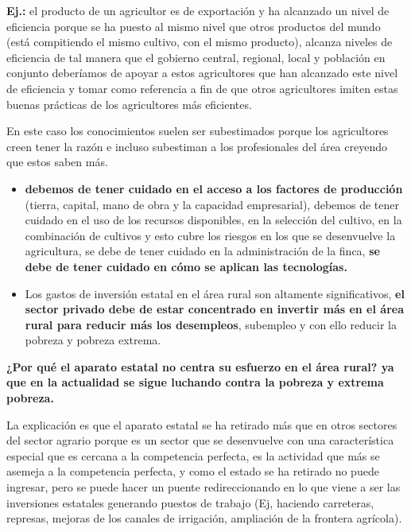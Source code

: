 \documentclass[
  a4paper,
]{article}
\begin{document}
\textbf{Ej.:} el producto de un agricultor es de exportación y ha
alcanzado un nivel de eficiencia porque se ha puesto al mismo nivel que
otros productos del mundo (está compitiendo el mismo cultivo, con el
mismo producto), alcanza niveles de eficiencia de tal manera que el
gobierno central, regional, local y población en conjunto deberíamos de
apoyar a estos agricultores que han alcanzado este nivel de eficiencia y
tomar como referencia a fin de que otros agricultores imiten estas
buenas prácticas de los agricultores más eficientes.

En este caso los conocimientos suelen ser subestimados porque los
agricultores creen tener la razón e incluso subestiman a los
profesionales del área creyendo que estos saben más.

\begin{itemize}
\item
  \textbf{debemos de tener cuidado en el acceso a los factores de
  producción} (tierra, capital, mano de obra y la capacidad
  empresarial), debemos de tener cuidado en el uso de los recursos
  disponibles, en la selección del cultivo, en la combinación de
  cultivos y esto cubre los riesgos en los que se desenvuelve la
  agricultura, se debe de tener cuidado en la administración de la
  finca, \textbf{se debe de tener cuidado en cómo se aplican las
  tecnologías.}
\item
  Los gastos de inversión estatal en el área rural son altamente
  significativos, \textbf{el sector privado debe de estar concentrado en
  invertir más en el área rural para reducir más los desempleos},
  subempleo y con ello reducir la pobreza y pobreza extrema.
\end{itemize}

\textbf{¿Por qué el aparato estatal no centra su esfuerzo en el área
rural? ya que en la actualidad se sigue luchando contra la pobreza y
extrema pobreza.}

La explicación es que el aparato estatal se ha retirado más que en otros
sectores del sector agrario porque es un sector que se desenvuelve con
una característica especial que es cercana a la competencia perfecta, es
la actividad que más se asemeja a la competencia perfecta, y como el
estado se ha retirado no puede ingresar, pero se puede hacer un puente
redireccionando en lo que viene a ser las inversiones estatales
generando puestos de trabajo (Ej, haciendo carreteras, represas, mejoras
de los canales de irrigación, ampliación de la frontera agrícola).
\end{document}
